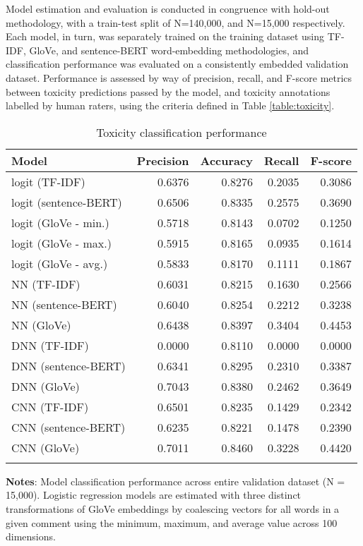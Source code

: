 
Model estimation and evaluation is conducted in congruence with hold-out methodology, with a train-test split of N=140,000, and N=15,000 respectively. Each model, in turn, was separately trained on the training dataset using TF-IDF, GloVe, and sentence-BERT word-embedding methodologies, and classification performance was evaluated on a consistently embedded validation dataset. Performance is assessed by way of precision, recall, and F-score metrics between toxicity predictions passed by the model, and toxicity annotations labelled by human raters, using the criteria defined in Table \ref{table:toxicity}.

\begin{table}[h]
	\caption{Toxicity classification performance \label{table:performance-total}}
    \centering
	\begin{tabular}{lrrrr}
		\toprule
			Model &  Precision &  Accuracy &  Recall &  F-score \\
		\midrule
			\addlinespace{}
			\parbox{7.5cm}{logit (TF-IDF)} &     0.6376 &    0.8276 &  0.2035 &   0.3086 \\
			\addlinespace{}
			logit (sentence-BERT) &     0.6506 &    0.8335 &  0.2575 &   0.3690 \\
			\addlinespace{}
			logit (GloVe - min.) &     0.5718 &    0.8143 &  0.0702 &   0.1250 \\
			\addlinespace{}
			logit (GloVe - max.) &     0.5915 &    0.8165 &  0.0935 &   0.1614 \\
			\addlinespace{}
			logit (GloVe - avg.) &     0.5833 &    0.8170 &  0.1111 &   0.1867 \\
			\addlinespace{}
			NN (TF-IDF) &     0.6031 &    0.8215 &  0.1630 &   0.2566 \\
			\addlinespace{}
			NN (sentence-BERT) &     0.6040 &    0.8254 &  0.2212 &   0.3238 \\
			\addlinespace{}
			NN (GloVe) &     0.6438 &    0.8397 &  0.3404 &   0.4453 \\
			\addlinespace{}
			DNN (TF-IDF) &     0.0000 &    0.8110 &  0.0000 &   0.0000 \\
			\addlinespace{}
			DNN (sentence-BERT) &     0.6341 &    0.8295 &  0.2310 &   0.3387 \\
			\addlinespace{}
			DNN (GloVe) &     0.7043 &    0.8380 &  0.2462 &   0.3649 \\
			\addlinespace{}
			CNN (TF-IDF) &      0.6501 &    0.8235 &  0.1429 &   0.2342 \\
			\addlinespace{}
			CNN (sentence-BERT)  &     0.6235 &    0.8221 &  0.1478 &   0.2390 \\
			\addlinespace{}
			CNN (GloVe)  &     0.7011 &    0.8460 &  0.3228 &   0.4420 \\
	\bottomrule
	\addlinespace[1em]
	\end{tabular}
	\parbox{14.5cm}{\textbf{Notes}: Model classification performance across entire validation dataset (N = 15,000). Logistic regression models are estimated with three distinct transformations of GloVe embeddings by coalescing vectors for all words in a given comment using the minimum, maximum, and average value across 100 dimensions.}
\end{table}

